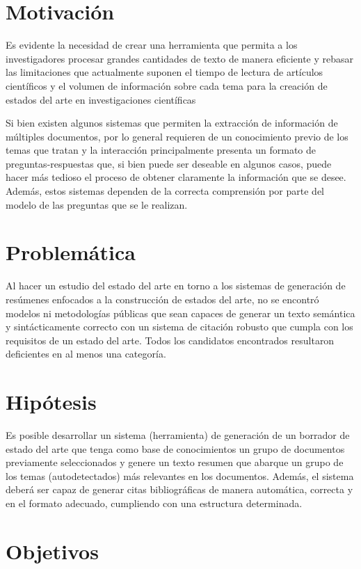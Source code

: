 \section{Motivación}
    Es evidente la necesidad de crear una herramienta que permita a los investigadores procesar grandes cantidades de texto de manera eficiente y rebasar las limitaciones que actualmente suponen el tiempo de lectura de artículos científicos y el volumen de información sobre cada tema para la creación de estados del arte en investigaciones científicas

    Si bien existen algunos sistemas\cite{elicit, scite} que permiten la extracción de información de múltiples documentos, por lo general requieren de un conocimiento previo de los temas que tratan y la interacción principalmente presenta un formato de preguntas-respuestas que, si bien puede ser deseable en algunos casos, puede hacer más tedioso el proceso de obtener claramente la información que se desee. Además, estos sistemas dependen de la correcta comprensión por parte del modelo de las preguntas que se le realizan.

\section{Problemática}
    Al hacer un estudio del estado del arte en torno a los sistemas de generación de resúmenes enfocados a la construcción de estados del arte, no se encontró modelos ni metodologías públicas que sean capaces de generar un texto semántica y sintácticamente correcto con un sistema de citación robusto que cumpla con los requisitos de un estado del arte. Todos los candidatos encontrados resultaron deficientes en al menos una categoría.

\section{Hipótesis}
    Es posible desarrollar un sistema (herramienta) de generación de un borrador de estado del arte que tenga como base de conocimientos un grupo de documentos previamente seleccionados y genere un texto resumen que abarque un grupo de los temas (autodetectados) más relevantes en los documentos. Además, el sistema deberá ser capaz de generar citas bibliográficas de manera automática, correcta y en el formato adecuado, cumpliendo con una estructura determinada.

\section{Objetivos}

